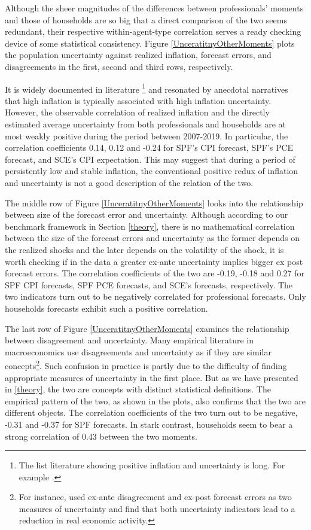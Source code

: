 \documentclass[12pt]{article}
\begin{document}
	Although the sheer magnitudes of the differences between professionals' moments and those of households are so big that a direct comparison of the two seems redundant, their respective within-agent-type correlation serves a ready checking device of some statistical consistency. Figure \ref{UnceratitnyOtherMoments} plots the population uncertainty against realized inflation,  forecast errors, and disagreements in the first, second and third rows, respectively. 
	
	It is widely documented in literature \footnote{The list literature showing positive inflation and uncertainty is long. For example \citet{ball1990inflation}. } and resonated by anecdotal narratives that high inflation is typically associated with high inflation uncertainty. However, the observable correlation of realized inflation and the directly estimated average uncertainty from both professionals and households are at most weakly positive during the period between 2007-2019. In particular, the correlation coefficients  0.14, 0.12 and -0.24 for SPF's CPI forecast, SPF's PCE forecast, and SCE's CPI expectation. This may suggest that during a period of persistently low and stable inflation, the conventional positive redux of inflation and uncertainty is not a good description of the relation of the two. 
	
	The middle row of Figure \ref{UnceratitnyOtherMoments} looks into the relationship between size of the forecast error and uncertainty. Although according to our benchmark framework in Section \ref{theory}, there is no mathematical correlation between the size of the forecast errors and uncertainty as the former depends on the realized shocks and the later depends on the volatility of the shock, it is worth checking if in the data a greater ex-ante uncertainty implies bigger ex post forecast errors. The correlation coefficients of the two are -0.19, -0.18 and 0.27 for SPF CPI forecasts, SPF PCE forecasts, and SCE's forecasts, respectively. The two indicators turn out to be negatively correlated for professional forecasts. Only households forecasts exhibit such a positive correlation.   
	
	The last row of Figure \ref{UnceratitnyOtherMoments} examines the relationship between disagreement and uncertainty. Many empirical literature in macroeconomics use disagreements and uncertainty as if they are similar concepts\footnote{For instance, \citet{bachmann2013uncertainty} used ex-ante disagreement and ex-post forecast errors as two measures of uncertainty and find that both uncertainty indicators lead to a reduction in real economic activity.}. Such confusion in practice is partly due to the difficulty of finding appropriate measures of uncertainty in the first place. But as we have presented in \ref{theory}, the two are concepts with distinct statistical definitions. The empirical pattern of the two,  as shown in the plots, also confirms that the two are different objects. The correlation coefficients of the two turn out to be negative, -0.31 and -0.37 for SPF forecasts. In stark contrast, households seem to bear a strong correlation of 0.43 between the two moments.  
	
\end{document}
